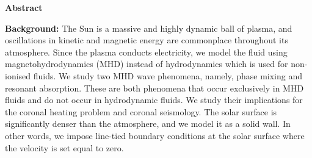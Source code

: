 \thispagestyle{plain}
\begin{center}
    
    
    
    \textbf{Abstract}
\end{center}

\begin{spacing}{1.1}

\noindent 

\textbf{Background:} 
The Sun is a massive and highly dynamic ball of plasma, and oscillations in kinetic and magnetic energy are commonplace throughout its atmosphere. Since the plasma conducts electricity, we model the fluid using magnetohydrodynamics (MHD) instead of hydrodynamics which is used for non-ionised fluids. We study two MHD wave phenomena, namely, phase mixing and resonant absorption. These are both phenomena that occur exclusively in MHD fluids and do not occur in hydrodynamic fluids. We study their implications for the coronal heating problem and coronal seismology. The solar surface is significantly denser than the atmosphere, and we model it as a solid wall. In other words, we impose line-tied boundary conditions at the solar surface where the velocity is set equal to zero.


\end{spacing}
